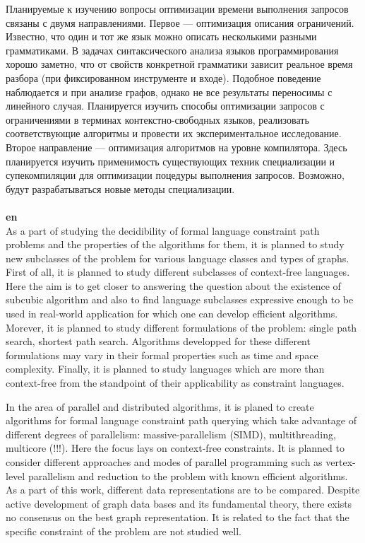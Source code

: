 \documentclass[12pt]{article}  %
\theoremstyle{remark}
\begin{document}
Планируемые к изучению вопросы оптимизации времени выполнения запросов связаны с двумя направлениями.
Первое --- оптимизация описания ограничений.
Известно, что один и тот же язык можно описать несколькими разными грамматиками.
В задачах синтаксического анализа языков программирования хорошо заметно, что от свойств конкретной грамматики зависит реальное время разбора (при фиксированном инструменте и входе).
Подобное поведение наблюдается и при анализе графов, однако не все результаты переносимы с линейного случая. Планируется изучить способы оптимизации запросов с ограничениями в терминах контекстно-свободных языков, реализовать соответствующие алгоритмы и провести их экспериментальное исследование. Второе направление --- оптимизация алгоритмов на уровне компилятора. Здесь планируется изучить применимость существующих техник специализации и супекомпиляции для оптимизации поцедуры выполнения запросов. Возможно, будут разрабатываться новые методы специализации.
\\
\\
\textbf{en}\\
As a part of studying the decidibility of formal language constraint path problems and the properties of the algorithms for them, it is planned to study new subclasses of the problem for various language classes and types of graphs. 
First of all, it is planned to study different subclasses of context-free languages.
Here the aim is to get closer to answering the question about the existence of subcubic algorithm and also to find language subclasses expressive enough to be used in real-world application for which one can develop efficient algorithms.
Morever, it is planned to study different formulations of the problem: single path search, shortest path search. 
Algorithms developped for these different formulations may vary in their formal properties such as time and space complexity. 
Finally, it is planned to study languages which are more than context-free from the standpoint of their applicability as constraint languages. 

In the area of parallel and distributed algorithms, it is planed to create algorithms for formal language constraint path querying which take advantage of different degrees of parallelism: massive-parallelism (SIMD), multithreading, multicore (!!!).
Here the focus lays on context-free constraints. 
It is planned to consider different approaches and modes of parallel programming such as vertex-level parallelism and reduction to the problem with known efficient algorithms.
As a part of this work, different data representations are to be compared.
Despite active development of graph data bases and its fundamental theory, there exists no consensus on the best graph representation. 
It is related to the fact that the specific constraint of the problem are not studied well. 
\end{document}
